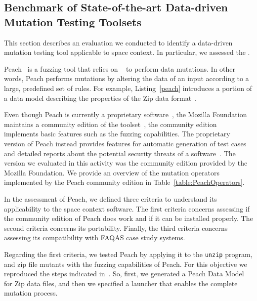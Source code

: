 \clearpage
\subsection{Benchmark of State-of-the-art Data-driven Mutation Testing Toolsets}
\label{sec:toolsComparisonDataDriven}

This section describes an evaluation we conducted to identify a data-driven mutation testing tool applicable to space context. In particular, we assessed the .






Peach~\cite{PeachMozilla,PeachFuzzer} is a fuzzing tool that relies on ~\cite{pham2016model,spike} to perform data mutations. In other words, Peach performs mutations by altering the data of an input according to a large, predefined set of rules. For example, Listing~\ref{peach} introduces a portion of a data model describing the properties of the Zip data format~\cite{zipformat}. 

Even though Peach is currently a proprietary software~\cite{PeachFuzzer}, the Mozilla Foundation maintains a community edition of the toolset~\cite{PeachMozilla}, the community edition implements basic features such as the fuzzing capabilities. The proprietary version of Peach instead provides features for automatic generation of test cases and detailed reports about the potential security threats of a software~\cite{PeachFuzzer}. The version we evaluated in this activity was the community edition provided by the Mozilla Foundation. We provide an overview of the mutation operators implemented by the Peach community edition in Table~\ref{table:PeachOperators}.


In the assessment of Peach, we defined three criteria to understand its applicability to the space context software. The first criteria concerns assessing if the community edition of Peach does work and if it can be installed properly. The second criteria concerns its portability. Finally, the third criteria concerns assessing its compatibility with FAQAS case study systems.

Regarding the first criteria, we tested Peach by applying it to the \texttt{unzip} program, and zip file mutants with the fuzzing capabilities of Peach. For this objective we reproduced the steps indicated in~\cite{zipexample}. So, first, we generated a Peach Data Model for Zip data files, and then we specified a launcher that enables the complete mutation process.

